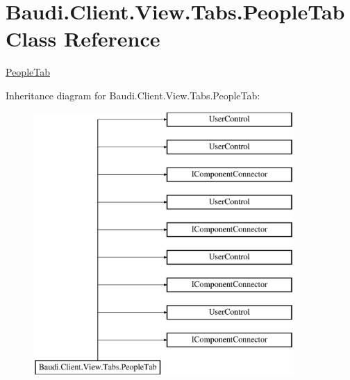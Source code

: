 \hypertarget{class_baudi_1_1_client_1_1_view_1_1_tabs_1_1_people_tab}{}\section{Baudi.\+Client.\+View.\+Tabs.\+People\+Tab Class Reference}
\label{class_baudi_1_1_client_1_1_view_1_1_tabs_1_1_people_tab}


\hyperlink{class_baudi_1_1_client_1_1_view_1_1_tabs_1_1_people_tab}{People\+Tab}  


Inheritance diagram for Baudi.\+Client.\+View.\+Tabs.\+People\+Tab\+:\begin{figure}[H]
\begin{center}
\leavevmode
\includegraphics[height=10.000000cm]{class_baudi_1_1_client_1_1_view_1_1_tabs_1_1_people_tab}
\end{center}
\end{figure}
